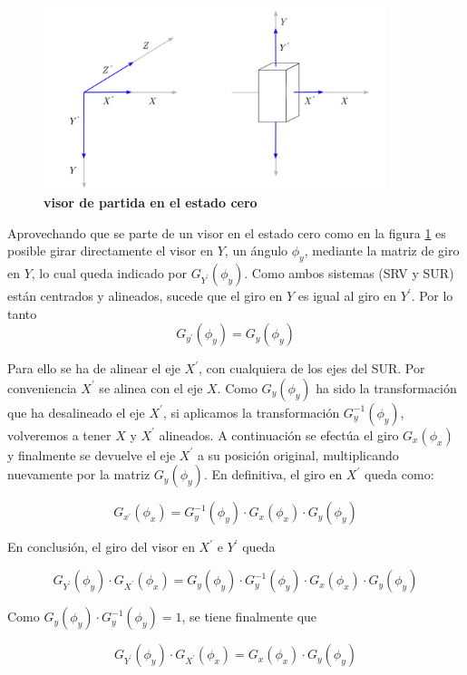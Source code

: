 \begin{figure}[h]
\includegraphics[width=10cm]{Img/GEO/geo-visor-9.png}
\centering
    \caption{\footnotesize{\textbf{visor de partida en el estado cero}}}
    \label{geo-visor9}
\end{figure}

Aprovechando que se parte de un visor en el estado cero como en la figura \ref{geo-visor9} es posible girar directamente el visor en $Y$, un ángulo ${\phi}_y$, mediante la matriz de giro en $Y$, lo cual queda indicado por $G_{Y^{\prime}}({\phi}_y)$. Como ambos sistemas (SRV y SUR) están centrados y alineados, sucede que el giro en $Y$ es igual al giro en $Y^{\prime}$. Por lo tanto
$$G_{y^{\prime}}({\phi}_y) = G_{y}({\phi}_y) $$

Para ello se ha de alinear el eje $X^{\prime}$, con cualquiera de los ejes del SUR. Por conveniencia $X^{\prime}$ se alinea con el eje $X$. Como $G_{y}({\phi}_y)$ ha sido la transformación que ha desalineado el eje $X^{\prime}$, si aplicamos la transformación
${G_{y}^{-1}}({\phi}_y)$, volveremos a tener $X$ y $X^{\prime}$ alineados. A continuación se efectúa el giro $G_{x}({\phi}_x)$ y finalmente se devuelve el eje $X^{\prime}$ a su posición original, multiplicando nuevamente por la matriz ${G_{y}}({\phi}_y)$. En definitiva, el giro en $X^{\prime}$ queda como:

$$G_{x^{\prime}}({\phi}_x) = {G_{y}^{-1}}({\phi}_y) \cdot G_{x}({\phi}_x) \cdot G_{y}({\phi}_y)$$

En conclusión, el giro del visor en $X^{\prime}$ e $Y^{\prime}$ queda 

$$G_{Y^{\prime}}({\phi}_y) \cdot G_{X^{\prime}}({\phi}_x) = G_{y}({\phi}_y) \cdot {G_{y}^{-1}}({\phi}_y) \cdot G_{x}({\phi}_x) \cdot G_{y}({\phi}_y)$$

Como $G_{y}({\phi}_y) \cdot {G_{y}^{-1}}({\phi}_y) = 1$, se tiene finalmente que

\begin{equation}G_{Y^{\prime}}({\phi}_y) \cdot G_{X^{\prime}}({\phi}_x) =  G_{x}({\phi}_x) \cdot G_{y}({\phi}_y) \end{equation}


